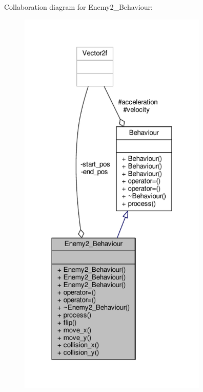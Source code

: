 Collaboration diagram for Enemy2\+\_\+\+Behaviour\+:\nopagebreak
\begin{figure}[H]
\begin{center}
\leavevmode
\includegraphics[width=255pt]{classEnemy2__Behaviour__coll__graph}
\end{center}
\end{figure}
